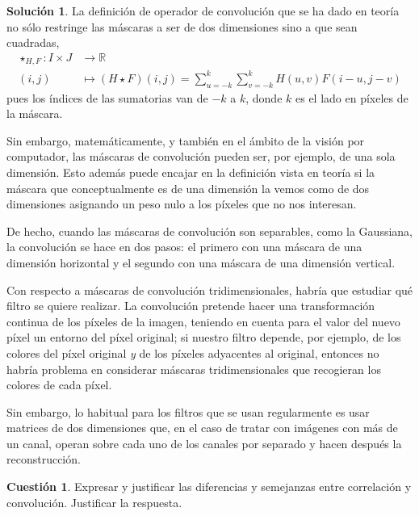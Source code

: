 \documentclass[a4paper, 11pt]{article}
\theoremstyle{definition}
\newtheorem*{solucion}{Solución}
\theoremstyle{theorem}
\newtheorem{cuestion}{Cuestión}
\begin{document}
  \begin{solucion}
      La definición de operador de convolución que se ha dado en teoría no sólo restringe las máscaras a ser de dos dimensiones sino a que sean cuadradas,
      \begin{align*}
          \star_{H,F}: I \times J &\longrightarrow \mathbb{R} \\
          (i,j) &\longmapsto (H \star F) (i,j) = \sum_{u=-k}^k\sum_{v=-k}^k H(u,v)F(i-u,j-v)
      \end{align*}
      pues los índices de las sumatorias van de $-k$ a $k$, donde $k$ es el lado en píxeles de la máscara.

      Sin embargo, matemáticamente, y también en el ámbito de la visión por computador, las máscaras de convolución pueden ser, por ejemplo, de una sola dimensión. Esto además puede encajar en la definición vista en teoría si la máscara que conceptualmente es de una dimensión la vemos como de dos dimensiones asignando un peso nulo a los píxeles que no nos interesan.

      De hecho, cuando las máscaras de convolución son separables, como la Gaussiana, la convolución se hace en dos pasos: el primero con una máscara de una dimensión horizontal y el segundo con una máscara de una dimensión vertical.

      Con respecto a máscaras de convolución tridimensionales, habría que estudiar qué filtro se quiere realizar. La convolución pretende hacer una transformación continua de los píxeles de la imagen, teniendo en cuenta para el valor del nuevo píxel un entorno del píxel original; si nuestro filtro depende, por ejemplo, de los colores del píxel original \emph{y} de los píxeles adyacentes al original, entonces no habría problema en considerar máscaras tridimensionales que recogieran los colores de cada píxel.

      Sin embargo, lo habitual para los filtros que se usan regularmente es usar matrices de dos dimensiones que, en el caso de tratar con imágenes con más de un canal, operan sobre cada uno de los canales por separado y hacen después la reconstrucción.
  \end{solucion}

  \begin{cuestion}
      Expresar y justificar las diferencias y semejanzas entre correlación y convolución. Justificar la respuesta.
  \end{cuestion}
\end{document}
